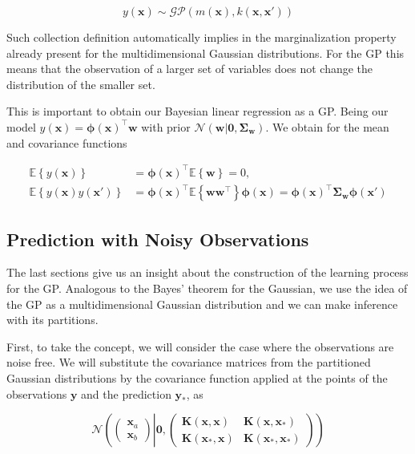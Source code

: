\documentclass[11pt]{article} %
\begin{document}
\begin{equation}
   y(\mathbf{x}) \sim \mathcal{GP} \left( m(\mathbf{x}), k(\mathbf{x},\mathbf{x'}) \right)
\end{equation}

Such collection definition automatically implies in the marginalization property already present for the multidimensional Gaussian distributions. For the GP this means that the observation of a larger set of variables does not change the distribution of the smaller set.

This is important to obtain our Bayesian linear regression as a GP. Being our model $y(\mathbf{x})=\boldsymbol{\phi}(\mathbf{x})^\top \mathbf{w}$ with prior $\mathcal{N}\left( \mathbf{w} | \mathbf{0}, \boldsymbol{\Sigma}_{\mathbf{w}}\right)$. We obtain for the mean and covariance functions

\begin{equation}
   \label{eq:gau-pro-mean-cov}
   \begin{aligned}
      \mathbb{E}\left\{ y(\mathbf{x}) \right\} &= \boldsymbol{\phi}(\mathbf{x})^\top \mathbb{E} \left\{ \mathbf{w} \right\} = 0,\\
      \mathbb{E}\left\{ y(\mathbf{x})y(\mathbf{x'}) \right\} &= \boldsymbol{\phi}(\mathbf{x})^\top \mathbb{E} \left\{ \mathbf{ww}^\top \right\}\boldsymbol{\phi}(\mathbf{x}) = \boldsymbol{\phi}(\mathbf{x})^\top \boldsymbol{\Sigma}_{\mathbf{w}} \boldsymbol{\phi}(\mathbf{x'})
   \end{aligned}
\end{equation}

\subsection{Prediction with Noisy Observations}

The last sections give us an insight about the construction of the learning process for the GP. Analogous to the Bayes' theorem for the Gaussian, we use the idea of the GP as a multidimensional Gaussian distribution and we can make inference with its partitions. 

First, to take the concept, we will consider the case where the observations are noise free. We will substitute the covariance matrices from the partitioned Gaussian distributions by the covariance function applied at the points of the observations $\mathbf{y}$ and the prediction $\mathbf{y_*}$, as

\begin{equation}
   \mathcal{N} \left( \left( \begin{array}{c}{\mathbf{x}_{a}} \\ {\mathbf{x}_{b}}\end{array} \right) \left| \mathbf{0}, \left( \begin{array}{ll}{\mathbf{K}(\mathbf{x},\mathbf{x})} & {\mathbf{K}(\mathbf{x},\mathbf{x_*})} \\ {\mathbf{K}(\mathbf{x_*},\mathbf{x})} & {\mathbf{K}(\mathbf{x_*},\mathbf{x_*})}\end{array} \right) \right. \right)
\end{equation}
\end{document}
